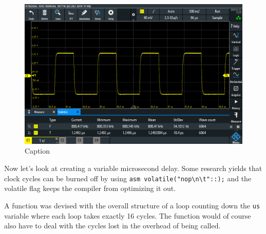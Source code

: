 \documentclass{article}
\begin{document}
\begin{figure}
    \centering\includegraphics[width=\textwidth]{HW4/HW4Scope.png}
    \caption{Caption}
    \label{hw4:fig:scope1}
\end{figure}

Now let's look at creating a variable microsecond delay.
Some research yields that clock cycles can be burned off by using \verb!asm volatile("nop\n\t"::);!
and the volatile flag keeps the compiler from optimizing it out.

A function was devised with the overall structure of a loop counting down the \verb"us" variable where each loop takes exactly 16 cycles. The function would of course also have to deal with the cycles lost in the overhead of being called.
\end{document}
